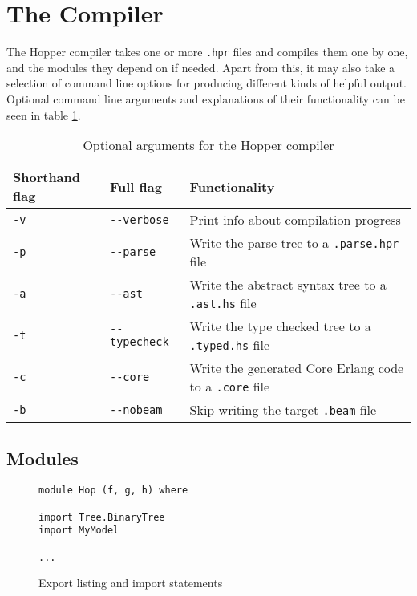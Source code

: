 \section{The Compiler}

The Hopper compiler takes one or more \texttt{.hpr} files and compiles them one by one, and the modules they depend on if needed. Apart from this, it may also take a selection of command line options for producing different kinds of helpful output. Optional command line arguments and explanations of their functionality can be seen in table \ref{tab:flags}.

\begin{table}[!htb]
\centering
\begin{tabular}{| l | l | l |}
\hline
Shorthand flag & Full flag            & Functionality\\
\hline
\texttt{-v}    & \texttt{-{}-verbose}   & Print info about compilation progress\\
\texttt{-p}    & \texttt{-{}-parse}     & Write the parse tree to a \texttt{.parse.hpr} file\\
\texttt{-a}    & \texttt{-{}-ast}       & Write the abstract syntax tree to a \texttt{.ast.hs} file\\
\texttt{-t}    & \texttt{-{}-typecheck} & Write the type checked tree to a \texttt{.typed.hs} file\\
\texttt{-c}    & \texttt{-{}-core}      & Write the generated Core Erlang code to a \texttt{.core} file\\
\texttt{-b}    & \texttt{-{}-nobeam}    & Skip writing the target \texttt{.beam} file\\
\hline
\end{tabular}
\caption[Optional arguments for the Hopper compiler]{Optional arguments for the Hopper compiler}
\label{tab:flags}
\end{table}



\subsection{Modules}

\begin{figure}[!htb]
\centering
\begin{minipage}[b]{0.43\linewidth}
\centering
\begin{lstlisting}
module Hop (f, g, h) where

import Tree.BinaryTree
import MyModel

...
\end{lstlisting}
\end{minipage}
\caption{Export listing and import statements}
\label{lst:exportimport}
\end{figure}

